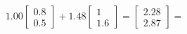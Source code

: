 \documentclass[preview]{standalone}
\begin{document}
\begin{align*}
1.00 \begin{bmatrix} 0.8 \\ 0.5 \end{bmatrix} + 1.48 \begin{bmatrix} 1 \\ 1.6 \end{bmatrix} = \begin{bmatrix} 2.28 \\ 2.87 \end{bmatrix} =
\end{align*}
\end{document}
